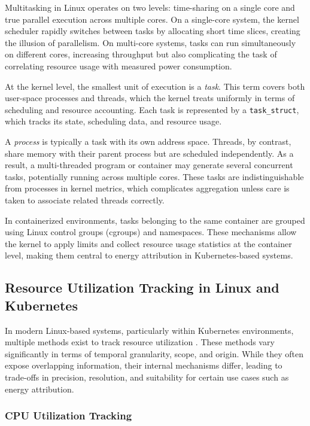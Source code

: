 Multitasking in Linux operates on two levels: time-sharing on a single core and true parallel execution across multiple cores. On a single-core system, the kernel scheduler rapidly switches between tasks by allocating short time slices, creating the illusion of parallelism. On multi-core systems, tasks can run simultaneously on different cores, increasing throughput but also complicating the task of correlating resource usage with measured power consumption.

At the kernel level, the smallest unit of execution is a \emph{task}. This term covers both user-space processes and threads, which the kernel treats uniformly in terms of scheduling and resource accounting. Each task is represented by a \texttt{task\_struct}, which tracks its state, scheduling data, and resource usage.

A \emph{process} is typically a task with its own address space. Threads, by contrast, share memory with their parent process but are scheduled independently. As a result, a multi-threaded program or container may generate several concurrent tasks, potentially running across multiple cores. These tasks are indistinguishable from processes in kernel metrics, which complicates aggregation unless care is taken to associate related threads correctly.

In containerized environments, tasks belonging to the same container are grouped using Linux control groups (cgroups) and namespaces. These mechanisms allow the kernel to apply limits and collect resource usage statistics at the container level, making them central to energy attribution in Kubernetes-based systems.

\subsection{Resource Utilization Tracking in Linux and Kubernetes}
\label{sec:utilization_tracking}

In modern Linux-based systems, particularly within Kubernetes environments, multiple methods exist to track resource utilization \parencite{kernelprocfs, kernelcgroupv1, kernelcgroupv2, ciliumbpf, cadvisorgithub, metricsservergithub}. These methods vary significantly in terms of temporal granularity, scope, and origin. While they often expose overlapping information, their internal mechanisms differ, leading to trade-offs in precision, resolution, and suitability for certain use cases such as energy attribution.

\subsubsection{CPU Utilization Tracking}


